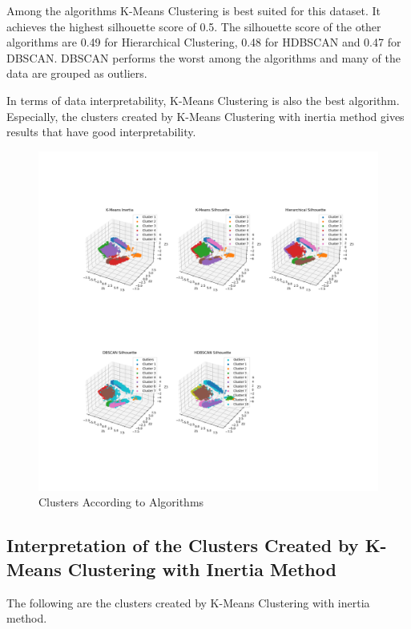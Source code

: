 \documentclass{article}
\begin{document}
            Among the algorithms K-Means Clustering is best suited for this dataset. 
            It achieves the highest silhouette score of 0.5.
            The silhouette score of the other algorithms are 0.49 for Hierarchical Clustering, 0.48 for HDBSCAN and 0.47 for DBSCAN.
            DBSCAN performs the worst among the algorithms and many of the data are grouped as outliers. 

            In terms of data interpretability, K-Means Clustering is also the best algorithm.
            Especially, the clusters created by K-Means Clustering with inertia method gives results that have good interpretability.

            
            \begin{figure}[h]
                \includegraphics[scale=0.285]{clusters.png}
                \caption{Clusters According to Algorithms}
                \label{fig:clusters}
            \end{figure}

            \subsection {Interpretation of the Clusters Created by K-Means Clustering with Inertia Method}
            
            The following are the clusters created by K-Means Clustering with inertia method.
\end{document}
